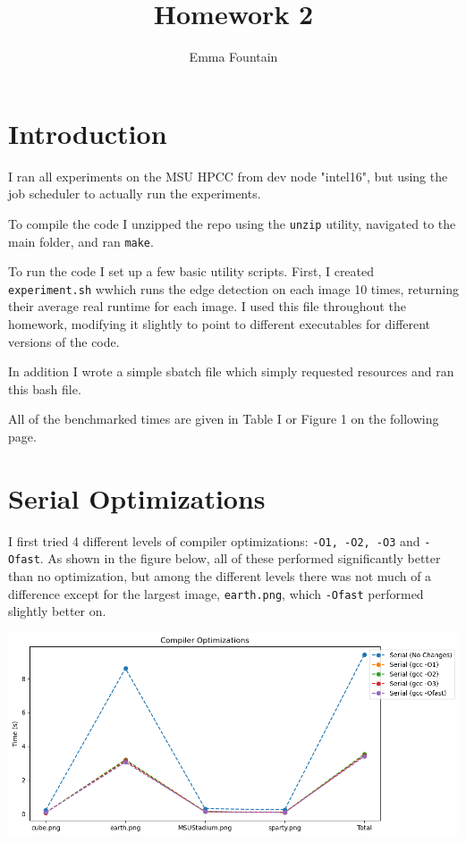 \documentclass[9pt, technote, onecolumn]{IEEEtran}
\begin{document}
\title{Homework 2}
\author{Emma Fountain}
\maketitle

\section{Introduction}

I ran all experiments on the MSU HPCC from dev node "intel16", but using the job scheduler to actually run the experiments.

To compile the code I unzipped the repo using the \texttt{unzip} utility, navigated to the main folder, and ran \texttt{make}.

To run the code I set up a few basic utility scripts. First, I created \texttt{experiment.sh} wwhich runs the edge detection on each image 10 times, returning their average real runtime for each image. I used this file throughout the homework, modifying it slightly to point to different executables for different versions of the code. 

In addition I wrote a simple sbatch file which simply requested resources and ran this bash file.

All of the benchmarked times are given in Table I or Figure 1 on the following page.

\section{Serial Optimizations}

I first tried 4 different levels of compiler optimizations: \texttt{-O1, -O2, -O3} and \texttt{-Ofast}. As shown in the figure below, all of these performed significantly better than no optimization, but among the different levels there was not much of a difference except for the largest image, \texttt{earth.png}, which \texttt{-Ofast} performed slightly better on.

\centering
\includegraphics[width=6in]{CompilerOptimizations.png}
\end{document}
